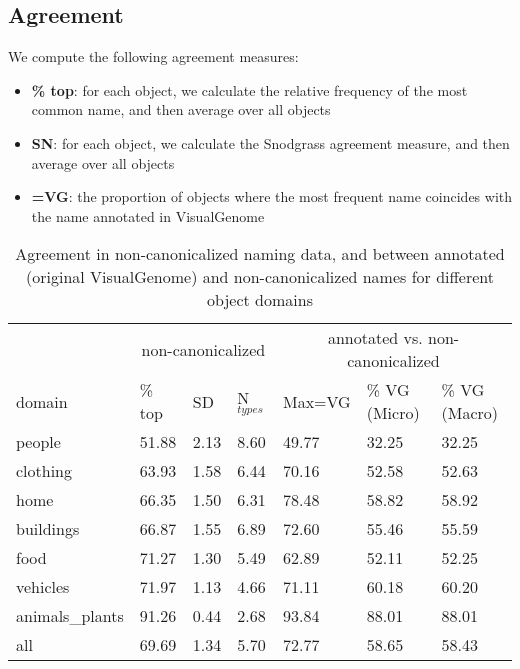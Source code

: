 \subsection{Agreement}

We compute the following agreement measures:

\begin{itemize}
\item \textbf{\% top}: for each object, we calculate the relative frequency of the most common name, and then average over all objects
\item \textbf{SN}: for each object, we calculate the Snodgrass agreement measure, and then average over all objects 
\item \textbf{=VG}: the proportion of objects where the most frequent name coincides with the name annotated in VisualGenome
\end{itemize}

\begin{table*}
\small
\centering
\begin{tabular}{llll|lll}
\toprule
& \multicolumn{3}{c}{non-canonicalized} & \multicolumn{3}{c}{annotated vs. non-canonicalized} \\
         domain &  \% top &    SD &     N$_{types}$ & Max=VG & \% VG (Micro) & \% VG (Macro) \\
\midrule
         people &  51.88 &  2.13 &  8.60 &  49.77 &        32.25 &        32.25 \\
       clothing &  63.93 &  1.58 &  6.44 &  70.16 &        52.58 &        52.63 \\
           home &  66.35 &  1.50 &  6.31 &  78.48 &        58.82 &        58.92 \\
      buildings &  66.87 &  1.55 &  6.89 &  72.60 &        55.46 &        55.59 \\
           food &  71.27 &  1.30 &  5.49 &  62.89 &        52.11 &        52.25 \\
       vehicles &  71.97 &  1.13 &  4.66 &  71.11 &        60.18 &        60.20 \\
 animals\_plants &  91.26 &  0.44 &  2.68 &  93.84 &        88.01 &        88.01 \\
 \midrule
             all &  69.69 &  1.34 &  5.70 &  72.77 &        58.65 &        58.43 \\
\bottomrule
\end{tabular}
\caption{Agreement in non-canonicalized naming data, and between annotated (original VisualGenome) and non-canonicalized names for different object domains }
\label{tab:agree}
\end{table*}


